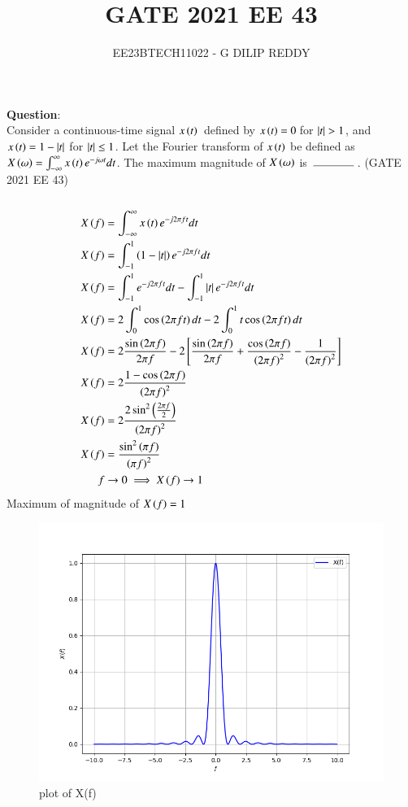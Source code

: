 \documentclass[journal,12pt,onecolumn]{IEEEtran}
\theoremstyle{remark}
\begin{document}

\vspace{3cm}

\title{GATE 2021 EE 43}
\author{EE23BTECH11022 - G DILIP REDDY}
\maketitle

\bigskip

\renewcommand{\thefigure}{\arabic{figure}}
\renewcommand{\thetable}{\arabic{table}}
\textbf{Question}:\\
Consider a continuous-time signal $x\left(t\right)$ \,defined by $x\left(t\right)=0$\,for $\left\vert t\right\vert>1$, and $x\left(t\right)=1-\left\vert t\right\vert$ for $\left\vert t\right\vert\le 1$. Let the Fourier transform of $x\left(t\right)$ be defined as $X\left(\omega\right)=\int_{-\infty}^{\infty}x\left(t\right)e^{-j\omega t} dt$. The maximum magnitude of $X\left(\omega\right)$ is $\hbox to 4em{\thinspace\hrulefill\thinspace}$.
\hfill{(GATE 2021 EE 43)}
\\\\
\solution
\fi
\begin{align}
X\left(f\right)&=\int_{-\infty}^{\infty}x\left(t\right)e^{-j2\pi f t} dt\\
X\left(f\right)&=\int_{-1}^{1}\left(1-\left\vert t\right\vert\right)e^{-j2\pi f t} dt\\
X\left(f\right)&=\int_{-1}^{1}e^{-j2\pi f t} 
dt - \int_{-1}^{1}\left\vert t\right\vert e^{-j2\pi f t} dt\\
X\left(f\right)&=2\int_{0}^{1}\cos\left({2\pi f t}\right)
dt - 2\int_{0}^{1}t\cos\left(2\pi f t\right) dt\\
X\left(f\right)&=2\frac{\sin\left({2\pi f }\right)}{2\pi f}
- 2{}\left[\frac{\sin\left(2\pi f \right)}{2\pi f}+\frac{\cos\left(2\pi f \right)}{\left(2\pi f\right)^2}-\frac{1}{\left(2\pi f \right)^2}\right]\\
X\left(f\right)&=2\frac{1-\cos\left(2\pi f \right)}{\left(2\pi f\right)^2}\\
X\left(f\right)&=2\frac{2\sin^2\left(\frac{2\pi f}{2}\right)}{\left(2\pi f\right)^2}\\
X\left(f\right)&=\frac{\sin^2\left(\pi f\right)}{\left(\pi f\right)^2}\\
f& \to 0 \implies X\left(f\right)\to1
\end{align}
Maximum of magnitude of $X\left(f\right)=1$
\begin{figure}[h]
    \centering
    \includegraphics[width=1\linewidth]{2021/EE/43/figs/graph.png}
    \caption{plot of X(f)}
\end{figure}
\end{document}
